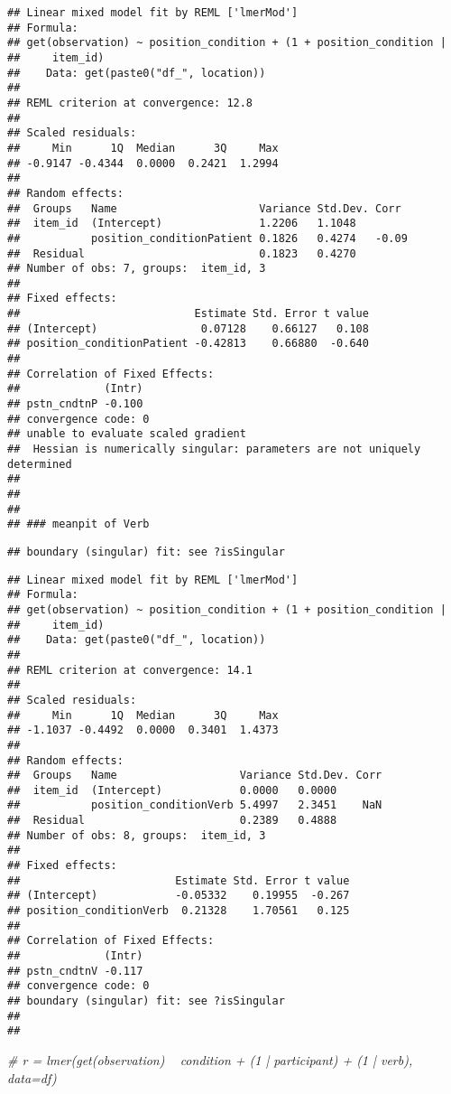 \documentclass[]{article}
\newenvironment{Shaded}{\begin{snugshade}}{\end{snugshade}}
\newcommand{\CommentTok}[1]{\textcolor[rgb]{0.56,0.35,0.01}{\textit{#1}}}
\begin{document}
\begin{verbatim}
## Linear mixed model fit by REML ['lmerMod']
## Formula: 
## get(observation) ~ position_condition + (1 + position_condition |  
##     item_id)
##    Data: get(paste0("df_", location))
## 
## REML criterion at convergence: 12.8
## 
## Scaled residuals: 
##     Min      1Q  Median      3Q     Max 
## -0.9147 -0.4344  0.0000  0.2421  1.2994 
## 
## Random effects:
##  Groups   Name                      Variance Std.Dev. Corr 
##  item_id  (Intercept)               1.2206   1.1048        
##           position_conditionPatient 0.1826   0.4274   -0.09
##  Residual                           0.1823   0.4270        
## Number of obs: 7, groups:  item_id, 3
## 
## Fixed effects:
##                           Estimate Std. Error t value
## (Intercept)                0.07128    0.66127   0.108
## position_conditionPatient -0.42813    0.66880  -0.640
## 
## Correlation of Fixed Effects:
##             (Intr)
## pstn_cndtnP -0.100
## convergence code: 0
## unable to evaluate scaled gradient
##  Hessian is numerically singular: parameters are not uniquely determined
## 
##   
##   
## ### meanpit of Verb
\end{verbatim}

\begin{verbatim}
## boundary (singular) fit: see ?isSingular
\end{verbatim}

\begin{verbatim}
## Linear mixed model fit by REML ['lmerMod']
## Formula: 
## get(observation) ~ position_condition + (1 + position_condition |  
##     item_id)
##    Data: get(paste0("df_", location))
## 
## REML criterion at convergence: 14.1
## 
## Scaled residuals: 
##     Min      1Q  Median      3Q     Max 
## -1.1037 -0.4492  0.0000  0.3401  1.4373 
## 
## Random effects:
##  Groups   Name                   Variance Std.Dev. Corr
##  item_id  (Intercept)            0.0000   0.0000       
##           position_conditionVerb 5.4997   2.3451    NaN
##  Residual                        0.2389   0.4888       
## Number of obs: 8, groups:  item_id, 3
## 
## Fixed effects:
##                        Estimate Std. Error t value
## (Intercept)            -0.05332    0.19955  -0.267
## position_conditionVerb  0.21328    1.70561   0.125
## 
## Correlation of Fixed Effects:
##             (Intr)
## pstn_cndtnV -0.117
## convergence code: 0
## boundary (singular) fit: see ?isSingular
## 
## 
\end{verbatim}

\begin{Shaded}
\begin{Highlighting}[]
    \CommentTok{# r = lmer(get(observation) ~ condition + (1 | participant) + (1 | verb), data=df)}
\end{Highlighting}
\end{Shaded}
\end{document}
